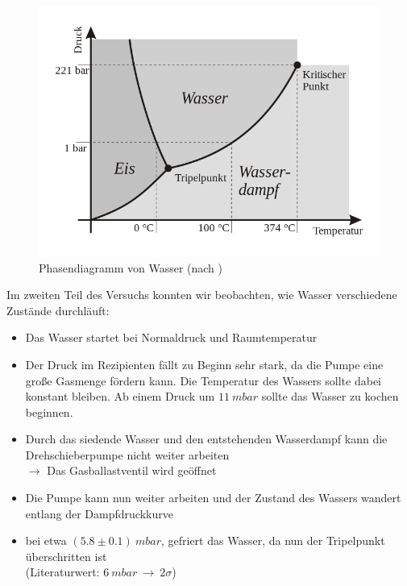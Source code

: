 \documentclass[12pt, a4paper]{scrartcl}
\begin{document}
		\begin{figure}[H]
			\centering
			\includegraphics[width=.5\paperwidth]{phasen-wasser}
			\caption{Phasendiagramm von Wasser (nach \cite{wikibooks})}
		\end{figure}
    
        Im zweiten Teil des Versuchs konnten wir beobachten, wie Wasser verschiedene Zustände durchläuft:
        
        \begin{itemize}
            \item Das Wasser startet bei Normaldruck und Raumtemperatur
            
            \item Der Druck im Rezipienten fällt zu Beginn sehr stark, da die Pumpe eine große Gasmenge fördern kann. Die Temperatur des Wassers sollte dabei konstant bleiben. Ab einem Druck um $11\ mbar$ sollte das Wasser zu kochen beginnen.
            
            \item Durch das siedende Wasser und den entstehenden Wasserdampf kann die Drehschieberpumpe nicht weiter arbeiten\\
            $\rightarrow$ Das Gasballastventil wird geöffnet
            
            \item Die Pumpe kann nun weiter arbeiten und der Zustand des Wassers wandert entlang der Dampfdruckkurve
            
            \item bei etwa $(5.8\pm0.1)\ mbar$, gefriert das Wasser, da nun der Tripelpunkt überschritten ist\\(Literaturwert: $6\ mbar\ \rightarrow\ 2\sigma$)
        \end{itemize}
\end{document}
